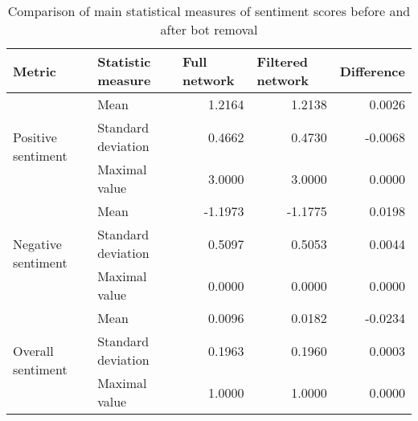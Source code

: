 \begin{table}[]
\caption{Comparison of main statistical measures of sentiment scores before and after bot removal}
\label{tab:sentiment-stats}
\begin{tabular}{llrrr} \toprule
\textbf{Metric}                     & \textbf{Statistic measure} & \multicolumn{1}{l}{\textbf{Full network}} & \multicolumn{1}{l}{\textbf{Filtered network}} & \multicolumn{1}{l}{\textbf{Difference}} \\ \midrule
\multirow{3}{*}{Positive sentiment} & Mean                       & 1.2164                                          & 1.2138                                         & 0.0026                                  \\
                                    & Standard deviation         & 0.4662                                          & 0.4730                                         & -0.0068                                 \\
                                    & Maximal value              & 3.0000                                          & 3.0000                                         & 0.0000                                  \\
\multirow{3}{*}{Negative sentiment} & Mean                       & -1.1973                                         & -1.1775                                        & 0.0198                                  \\
                                    & Standard deviation         & 0.5097                                          & 0.5053                                         & 0.0044                                  \\
                                    & Maximal value              & 0.0000                                          & 0.0000                                         & 0.0000                                  \\
\multirow{3}{*}{Overall sentiment}  & Mean                       & 0.0096                                          & 0.0182                                         & -0.0234                                 \\
                                    & Standard deviation         & 0.1963                                          & 0.1960                                         & 0.0003                                  \\
                                    & Maximal value              & 1.0000                                          & 1.0000                                         & 0.0000     \\ \bottomrule                            
\end{tabular}
\end{table}

